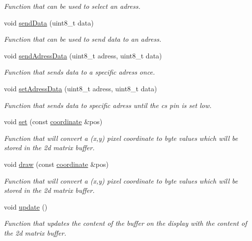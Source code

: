 \begin{DoxyCompactItemize}
\begin{DoxyCompactList}\small\item\em Function that can be used to select an adress. \end{DoxyCompactList}\item 
void \hyperlink{classdisplay_afaec31b348110cd7f81ff690dc70b5a9}{send\+Data} (uint8\+\_\+t data)
\begin{DoxyCompactList}\small\item\em Function that can be used to send data to an adress. \end{DoxyCompactList}\item 
void \hyperlink{classdisplay_a261f1f8f23a0e7d341df5104de842e8e}{send\+Adress\+Data} (uint8\+\_\+t adress, uint8\+\_\+t data)
\begin{DoxyCompactList}\small\item\em Function that sends data to a specific adress once. \end{DoxyCompactList}\item 
void \hyperlink{classdisplay_a0c59879dfb0edeeca81c34d23cdde404}{set\+Adress\+Data} (uint8\+\_\+t adress, uint8\+\_\+t data)
\begin{DoxyCompactList}\small\item\em Function that sends data to specific adress until the cs pin is set low. \end{DoxyCompactList}\item 
void \hyperlink{classdisplay_a3703b7e40fdcabbd0172f83f97b3e266}{set} (const \hyperlink{classcoordinate}{coordinate} \&pos)
\begin{DoxyCompactList}\small\item\em Function that will convert a (x,y) pixel coordinate to byte values which will be stored in the 2d matrix buffer. \end{DoxyCompactList}\item 
void \hyperlink{classdisplay_aca1bd1091510f20061868d1f6c5a8500}{draw} (const \hyperlink{classcoordinate}{coordinate} \&pos)
\begin{DoxyCompactList}\small\item\em Function that will convert a (x,y) pixel coordinate to byte values which will be stored in the 2d matrix buffer. \end{DoxyCompactList}\item 
\mbox{\label{classdisplay_a9bdf1736088cacf0d4ecb26a9784eb7b}} 
void \hyperlink{classdisplay_a9bdf1736088cacf0d4ecb26a9784eb7b}{update} ()
\begin{DoxyCompactList}\small\item\em Function that updates the content of the buffer on the display with the content of the 2d matrix buffer. \end{DoxyCompactList}\item 

\end{DoxyCompactItemize}
